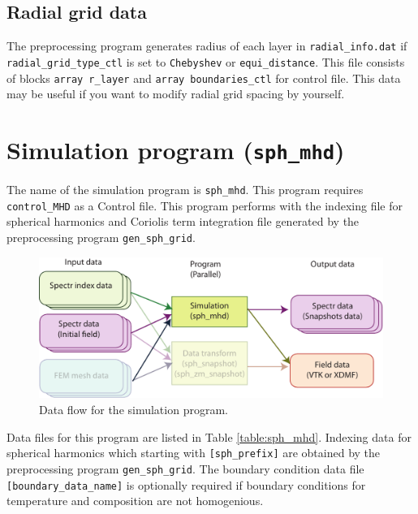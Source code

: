 \subsection{Radial grid data}
The preprocessing program generates radius of each layer in \verb|radial_info.dat| if \verb|radial_grid_type_ctl| is set to \verb|Chebyshev| or \verb|equi_distance|. This file consists of blocks \verb|array r_layer| and \verb|array boundaries_ctl| for control file. This data may be useful if you want to modify radial grid spacing by yourself.


\newpage
\section{Simulation program ({\tt sph\_mhd})}
\label{section:sph_mhd}
%

The name of the simulation program is {\tt sph\_mhd}. This program requires {\tt control\_MHD} as a Control file. This program performs with the indexing file for spherical harmonics and Coriolis term integration file generated by the preprocessing program {\tt gen\_sph\_grid}.
%
\begin{figure}[htbp]
\begin{center}
\includegraphics*[width=130mm]{images/flow_2}
\end{center}
\caption{Data flow for the simulation program.}
\label{fig:flow_2}
\end{figure}
%
Data files for this program are listed in Table \ref{table:sph_mhd}. Indexing data for spherical harmonics which starting with \verb|[sph_prefix]| are obtained by the preprocessing program \verb|gen_sph_grid|. The boundary condition data file \verb|[boundary_data_name]| is optionally required if boundary conditions for temperature and composition are not homogenious.
%
